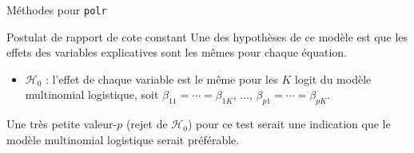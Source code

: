 \documentclass[
  ignorenonframetext,
]{beamer}
\newenvironment{Shaded}{\begin{snugshade}}{\end{snugshade}}
\newcommand{\CommentTok}[1]{\textcolor[rgb]{0.37,0.37,0.37}{#1}}
\newcommand{\FunctionTok}[1]{\textcolor[rgb]{0.28,0.35,0.67}{#1}}
\newcommand{\NormalTok}[1]{\textcolor[rgb]{0.00,0.23,0.31}{#1}}
\newcommand{\SpecialCharTok}[1]{\textcolor[rgb]{0.37,0.37,0.37}{#1}}
\providecommand{\tightlist}{%
  \setlength{\itemsep}{0pt}\setlength{\parskip}{0pt}}\usepackage{longtable,booktabs,array}
\begin{document}
\begin{frame}[fragile]{Méthodes pour \texttt{polr}}
\protect\hypertarget{muxe9thodes-pour-polr}{}
\begin{Shaded}
\end{Shaded}
\end{frame}

\begin{frame}{Postulat de rapport de cote constant}
\protect\hypertarget{postulat-de-rapport-de-cote-constant}{}
Une des hypothèses de ce modèle est que les effets des variables
explicatives sont les mêmes pour chaque équation.

\begin{itemize}
\tightlist
\item
  \(\mathscr{H}_0\) : l'effet de chaque variable est le même pour les
  \(K\) logit du modèle multinomial logistique, soit
  \(\beta_{11} = \cdots =\beta_{1K}\), \(\ldots\),
  \(\beta_{p1} = \cdots =\beta_{pK}\).
\end{itemize}

Une très petite valeur-\(p\) (rejet de \(\mathscr{H}_0\)) pour ce test
serait une indication que le modèle multinomial logistique serait
préférable.
\end{frame}
\end{document}
